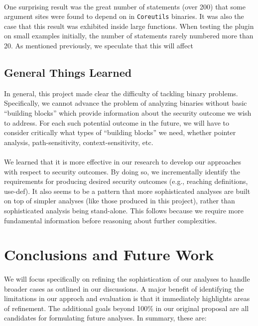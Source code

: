 \documentclass[letterpaper,11pt]{article}
\begin{document}
\paragraph{}
One surprising result was the great number of statements (over
200) that some argument sites were found to depend on in \texttt{Coreutils}
binaries. It was also the case that this result was exhibited inside large
functions. When testing the plugin on small examples initially, the number of
statements rarely numbered more than 20. As mentioned previously, we speculate
that this will affect

\subsection{General Things Learned}

In general, this project made clear the difficulty of tackling binary
problems. Specifically, we cannot advance the problem of analyzing binaries
without basic ``building blocks'' which provide information about the security
outcome we wish to address. For each such potential outcome in the future,
we will have to consider critically what types of ``building blocks'' we need,
whether pointer analysis, path-sensitivity, context-sensitivity, etc.

\paragraph{}
We learned that it is more effective in our research to develop our approaches
with respect to security outcomes. By doing so, we incrementally identify the
requirements for producing desired security outcomes (e.g., reaching
definitions, use-def). It also seems to be a pattern that more sophisticated
analyses are built on top of simpler analyses (like those produced in this
project), rather than sophisticated analysis being stand-alone. This follows
because we require more fundamental information before reasoning about
further complexities.

\section{Conclusions and Future Work}
\paragraph{}
We will focus specifically on refining the sophistication of our analyses
to handle broader cases as outlined in our discussions. A major benefit of
identifying the limitations in our approch and evaluation is that it
immediately highlights areas of refinement. The additional goals beyond 100\%
in our original proposal are all candidates for formulating future analyses.
In summary, these are:
\end{document}
